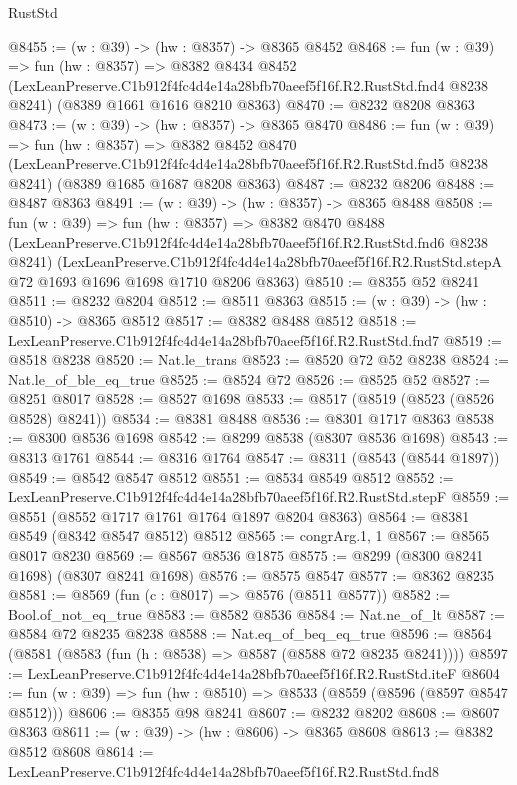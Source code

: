 \begin{lexlean}{RustStd}
\begin{coremodule}
@8455 := (w : @39) -> (hw : @8357) -> @8365 @8452
@8468 := fun (w : @39) =>
  fun (hw : @8357) =>
  @8382
    @8434
    @8452
    (LexLeanPreserve.C1b912f4fc4d4e14a28bfb70aeef5f16f.R2.RustStd.fnd4 @8238 @8241)
    (@8389 @1661 @1616 @8210 @8363)
@8470 := @8232 @8208 @8363
@8473 := (w : @39) -> (hw : @8357) -> @8365 @8470
@8486 := fun (w : @39) =>
  fun (hw : @8357) =>
  @8382
    @8452
    @8470
    (LexLeanPreserve.C1b912f4fc4d4e14a28bfb70aeef5f16f.R2.RustStd.fnd5 @8238 @8241)
    (@8389 @1685 @1687 @8208 @8363)
@8487 := @8232 @8206
@8488 := @8487 @8363
@8491 := (w : @39) -> (hw : @8357) -> @8365 @8488
@8508 := fun (w : @39) =>
  fun (hw : @8357) =>
  @8382
    @8470
    @8488
    (LexLeanPreserve.C1b912f4fc4d4e14a28bfb70aeef5f16f.R2.RustStd.fnd6 @8238 @8241)
    (LexLeanPreserve.C1b912f4fc4d4e14a28bfb70aeef5f16f.R2.RustStd.stepA
      @72
      @1693
      @1696
      @1698
      @1710
      @8206
      @8363)
@8510 := @8355 @52 @8241
@8511 := @8232 @8204
@8512 := @8511 @8363
@8515 := (w : @39) -> (hw : @8510) -> @8365 @8512
@8517 := @8382 @8488 @8512
@8518 := LexLeanPreserve.C1b912f4fc4d4e14a28bfb70aeef5f16f.R2.RustStd.fnd7
@8519 := @8518 @8238
@8520 := Nat.le_trans
@8523 := @8520 @72 @52 @8238
@8524 := Nat.le_of_ble_eq_true
@8525 := @8524 @72
@8526 := @8525 @52
@8527 := @8251 @8017
@8528 := @8527 @1698
@8533 := @8517 (@8519 (@8523 (@8526 @8528) @8241))
@8534 := @8381 @8488
@8536 := @8301 @1717 @8363
@8538 := @8300 @8536 @1698
@8542 := @8299 @8538 (@8307 @8536 @1698)
@8543 := @8313 @1761
@8544 := @8316 @1764
@8547 := @8311 (@8543 (@8544 @1897))
@8549 := @8542 @8547 @8512
@8551 := @8534 @8549 @8512
@8552 := LexLeanPreserve.C1b912f4fc4d4e14a28bfb70aeef5f16f.R2.RustStd.stepF
@8559 := @8551 (@8552 @1717 @1761 @1764 @1897 @8204 @8363)
@8564 := @8381 @8549 (@8342 @8547 @8512) @8512
@8565 := congrArg.{1, 1}
@8567 := @8565 @8017 @8230
@8569 := @8567 @8536 @1875
@8575 := @8299 (@8300 @8241 @1698) (@8307 @8241 @1698)
@8576 := @8575 @8547
@8577 := @8362 @8235
@8581 := @8569 (fun (c : @8017) => @8576 (@8511 @8577))
@8582 := Bool.of_not_eq_true
@8583 := @8582 @8536
@8584 := Nat.ne_of_lt
@8587 := @8584 @72 @8235 @8238
@8588 := Nat.eq_of_beq_eq_true
@8596 := @8564 (@8581 (@8583 (fun (h : @8538) => @8587 (@8588 @72 @8235 @8241))))
@8597 := LexLeanPreserve.C1b912f4fc4d4e14a28bfb70aeef5f16f.R2.RustStd.iteF
@8604 := fun (w : @39) => fun (hw : @8510) => @8533 (@8559 (@8596 (@8597 @8547 @8512)))
@8606 := @8355 @98 @8241
@8607 := @8232 @8202
@8608 := @8607 @8363
@8611 := (w : @39) -> (hw : @8606) -> @8365 @8608
@8613 := @8382 @8512 @8608
@8614 := LexLeanPreserve.C1b912f4fc4d4e14a28bfb70aeef5f16f.R2.RustStd.fnd8

\end{coremodule}
\end{lexlean}
